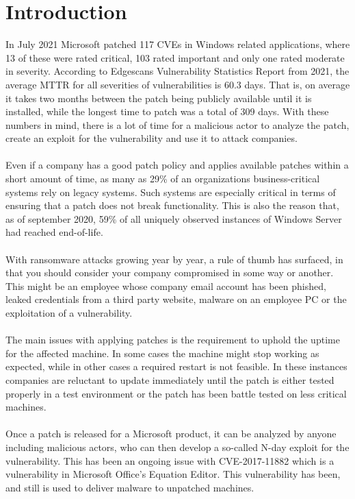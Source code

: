 \documentclass{report}
\begin{document}
\chapter{Introduction}
\label{cha:introduction}
In July 2021 Microsoft patched 117 CVEs in Windows related applications\cite{url:patch-tuesday:2021:july}, where 13 of these were rated critical, 103 rated important and only one rated moderate in severity. According to Edgescans Vulnerability Statistics Report from 2021\cite{url:edgescan:2021}, the average \gls{MTTR} for all severities of vulnerabilities is 60.3 days. That is, on average it takes two months between the patch being publicly available until it is installed, while the longest time to patch was a total of 309 days. With these numbers in mind, there is a lot of time for a malicious actor to analyze the patch, create an exploit for the vulnerability and use it to attack companies.
\\
\\
Even if a company has a good patch policy and applies available patches within a short amount of time, as many as 29\%\cite{url:legacy-report} of an organizations business-critical systems rely on legacy systems. Such systems are especially critical in terms of ensuring that a patch does not break functionality. This is also the reason that, as of september 2020, 59\% of all uniquely observed instances of Windows Server had reached end-of-life\cite{url:unsupported-report}.
\\
\\
With ransomware attacks growing year by year\cite{url:ransomware-statistics}, a rule of thumb has surfaced, in that you should consider your company compromised in some way or another. This might be an employee whose company email account has been phished, leaked credentials from a third party website, malware on an employee PC or the exploitation of a vulnerability.
\\
\\
The main issues with applying patches is the requirement to uphold the uptime for the affected machine. In some cases the machine might stop working as expected, while in other cases a required restart is not feasible. In these instances companies are reluctant to update immediately until the patch is either tested properly in a test environment or the patch has been battle tested on less critical machines.
\\
\\
Once a patch is released for a Microsoft product, it can be analyzed by anyone including malicious actors, who can then develop a so-called N-day exploit for the vulnerability. This has been an ongoing issue with CVE-2017-11882\cite{url:n-days} which is a vulnerability in Microsoft Office's Equation Editor. This vulnerability has been, and still is used to deliver malware to unpatched machines.
\end{document}
